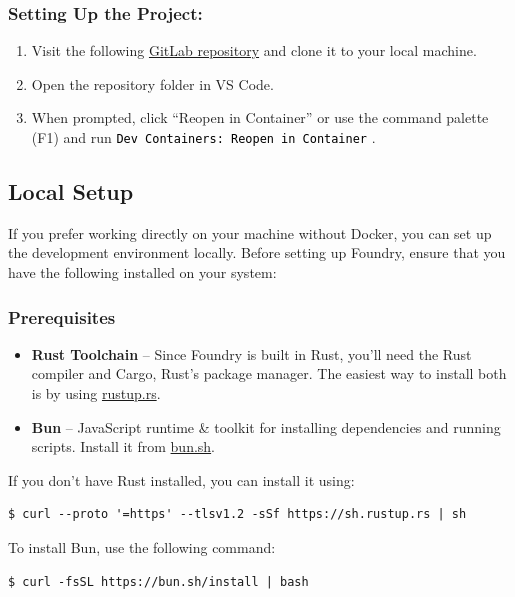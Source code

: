 \documentclass[12pt]{article}
\newcommand{\codegrey}[1]{%
  \texttt{\colorbox{black!4}{\textcolor{black}{#1}}}%
}
\begin{document}
\subsubsection*{Setting Up the Project:}

\begin{enumerate}
    \item Visit the following
          \href{https://gitlab.fel.cvut.cz/radovluk/smart-contracts-exercises/-/tree/main/09-Vulnerabilities-Detection/task/task-code}{GitLab
              repository} and clone it to your local machine.
    \item Open the repository folder in VS Code.
    \item When prompted, click ``Reopen in Container'' or use the command palette (F1)
          and run \codegrey{Dev Containers: Reopen in Container}.
\end{enumerate}

\subsection{Local Setup}

If you prefer working directly on your machine without Docker, you can set up
the development environment locally. Before setting up Foundry, ensure that you
have the following installed on your system:

\subsubsection*{Prerequisites}
\begin{itemize}
    \item \textbf{Rust Toolchain} -- Since Foundry is built in Rust, you'll need the Rust compiler and Cargo, Rust's package manager. The easiest way to install both is by using \href{https://rustup.rs/}{rustup.rs}.
    \item \textbf{Bun} -- JavaScript runtime \& toolkit for installing dependencies and running scripts. Install it from \href{https://bun.sh/}{bun.sh}.
\end{itemize}

\noindent
If you don't have Rust installed, you can install it using:

\begin{verbatim}
$ curl --proto '=https' --tlsv1.2 -sSf https://sh.rustup.rs | sh
\end{verbatim}

\noindent
To install Bun, use the following command:
\begin{verbatim}
$ curl -fsSL https://bun.sh/install | bash
\end{verbatim}
\end{document}
